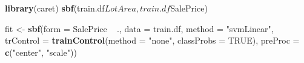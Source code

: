 \documentclass[]{article}
\newenvironment{Shaded}{\begin{snugshade}}{\end{snugshade}}
\newcommand{\KeywordTok}[1]{\textcolor[rgb]{0.13,0.29,0.53}{\textbf{{#1}}}}
\newcommand{\DataTypeTok}[1]{\textcolor[rgb]{0.13,0.29,0.53}{{#1}}}
\newcommand{\StringTok}[1]{\textcolor[rgb]{0.31,0.60,0.02}{{#1}}}
\newcommand{\OtherTok}[1]{\textcolor[rgb]{0.56,0.35,0.01}{{#1}}}
\newcommand{\NormalTok}[1]{{#1}}
\begin{document}
\begin{Shaded}
\begin{Highlighting}[]
\KeywordTok{library}\NormalTok{(caret)}
\KeywordTok{sbf}\NormalTok{(train.df$LotArea, train.df$SalePrice)}

\NormalTok{fit <-}\StringTok{ }\KeywordTok{sbf}\NormalTok{(}\DataTypeTok{form =} \NormalTok{SalePrice ~}\StringTok{ }\NormalTok{.,}
           \DataTypeTok{data =} \NormalTok{train.df, }
           \DataTypeTok{method =} \StringTok{"svmLinear"}\NormalTok{,}
           \DataTypeTok{trControl =} \KeywordTok{trainControl}\NormalTok{(}\DataTypeTok{method =} \StringTok{"none"}\NormalTok{, }
                                    \DataTypeTok{classProbs =} \OtherTok{TRUE}\NormalTok{),}
           \DataTypeTok{preProc =} \KeywordTok{c}\NormalTok{(}\StringTok{"center"}\NormalTok{, }\StringTok{"scale"}\NormalTok{))}
\end{Highlighting}
\end{Shaded}
\end{document}
